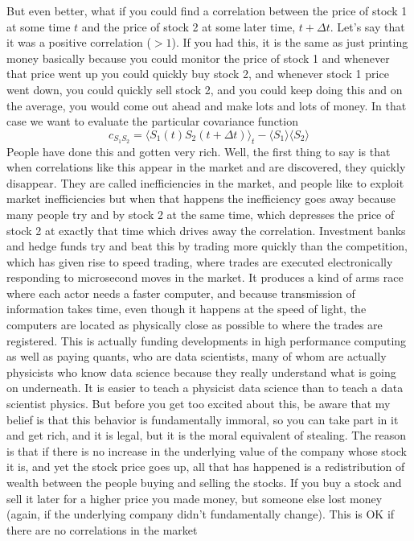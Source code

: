 \documentclass[]{revtex4}
\newcommand{\sm}[1]{{\[#1\]}}
\begin{document}
But even better, what if you could find a correlation between the price of stock 1 at some time $t$ and the price of stock 2 at some later time, $t+\Delta t$.
Let's say that it was a positive correlation ($>1$).  If you had this, it is the same as just printing money basically because you could monitor the price
of stock 1 and whenever that price went up you could quickly buy stock 2, and whenever stock 1 price went down, you could quickly sell stock 2, and you
could keep doing this and on the average, you would come out ahead and make lots and lots of money.  In that case we want to evaluate the particular
covariance function
\sm{c_{S_1S_2} = \langle S_1(t)S_2(t+\Delta t)\rangle_t-\langle S_1\rangle\langle S_2\rangle}
People have done this and gotten very rich.
Well, the first thing to say is that when correlations like this appear in the market and are discovered, they quickly disappear.  They are called
inefficiencies in the market, and people like to exploit market inefficiencies but when that happens the inefficiency goes away because many people try and
by stock 2 at the same time, which depresses the price of stock 2 at exactly that time which drives away the correlation.  Investment banks and hedge funds
try and beat this by trading more quickly than the competition, which has given rise to speed trading, where trades are executed electronically responding to
microsecond moves in the market.  It produces a kind of arms race where each actor needs a faster computer, and because transmission of information takes time,
even though it happens at the speed of light, the computers are located as physically close as possible to where the trades are registered.  This is actually
funding developments in high performance computing as well as paying quants, who are data scientists, many of whom are actually physicists who know data science
because they really understand what is going on underneath.  It is easier to teach a physicist data science than to teach a data scientist physics.  But before
you get too excited about this, be aware that my belief is that this behavior is fundamentally immoral, so you can take part in it and get rich, and it is
legal, but it is the
moral equivalent of stealing.  The reason is that if there is no increase in the underlying value of the company whose stock it is, and yet the stock price goes
up, all that has happened is a redistribution of wealth between the people buying and selling the stocks.  If you buy a stock and sell it later for a higher price
you made money, but someone else lost money (again, if the underlying company didn't fundamentally change).  This is OK if there are no correlations in the market
\end{document}

